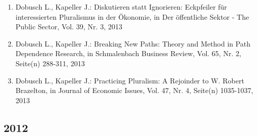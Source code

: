 \begin{enumerate}
	 \item Dobusch L., Kapeller J.: Diskutieren statt Ignorieren: Eckpfeiler für interessierten Pluralismus in der Ökonomie, in Der öffentliche Sektor - The Public Sector, Vol. 39, Nr. 3, 2013
	 \item Dobusch L., Kapeller J.: Breaking New Paths: Theory and Method in Path Dependence Research, in Schmalenbach Business Review, Vol. 65, Nr. 2, Seite(n) 288-311, 2013
	 \item Dobusch L., Kapeller J.: Practicing Pluralism: A Rejoinder to W. Robert Brazelton, in Journal of Economic Issues, Vol. 47, Nr. 4, Seite(n) 1035-1037, 2013
\end{enumerate}
\subsection*{2012}
